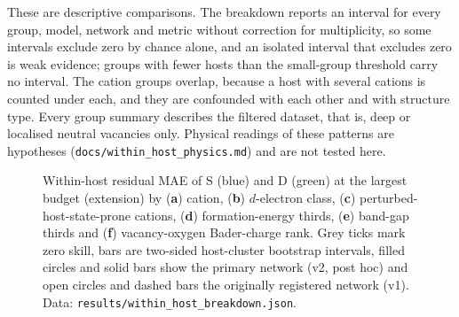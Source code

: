 These are descriptive comparisons. The breakdown reports an interval for every group, model, network and metric
without correction for multiplicity, so some intervals exclude zero by chance alone, and an isolated interval that
excludes zero is weak evidence; groups with fewer hosts than the small-group threshold carry no interval. The
cation groups overlap, because a host with several cations is counted under each, and they are confounded with
each other and with structure type. Every group summary describes the filtered dataset, that is, deep or
localised neutral vacancies only. Physical readings of these patterns are hypotheses
(\texttt{docs/within\_host\_physics.md}) and are not tested here.

\begin{table}[htbp]
\caption{Within-host residual MAE (eV) at \numWithinHostBreakdownBudget{} training hosts by group (extension;
both networks; v2 post hoc). Hosts and sites: those with at least two tested sites, on which the within-host residual MAE
is defined. Zero skill: the within-host residual MAE of any predictor constant within a host. Point values; the
two-sided intervals of the host-cluster bootstrap, and the per-cation groups of Figure~\ref{fig:si_withinhost_groups}a, are
in \texttt{results/within\_host\_breakdown.json} (\texttt{payload.groups}). The unassigned $d$ class is below the
small-group threshold and is descriptive only.}
\label{tab:withinhost}
\centering\small

\end{table}

\begin{figure}[htbp]
\centering
{}
\caption{Within-host residual MAE of S (blue) and D (green) at the largest budget (extension) by (\textbf{a}) cation,
(\textbf{b}) $d$-electron class, (\textbf{c}) perturbed-host-state-prone cations, (\textbf{d}) formation-energy
thirds, (\textbf{e}) band-gap thirds and (\textbf{f}) vacancy-oxygen Bader-charge rank. Grey ticks mark zero skill,
bars are two-sided host-cluster bootstrap intervals, filled circles and solid bars show the primary network (v2,
post hoc) and open circles and dashed bars the originally registered network (v1). Data:
\texttt{results/within\_host\_breakdown.json}.}
\label{fig:si_withinhost_groups}
\end{figure}
\FloatBarrier
